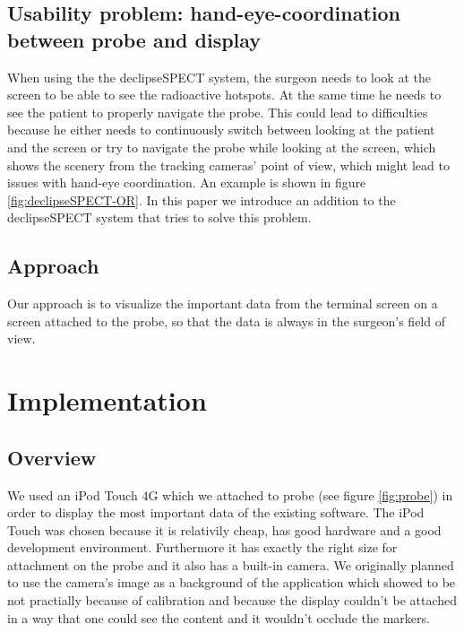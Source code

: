 \documentclass{scrartcl}
\newcommand{\red}[1]{{\color{red} #1}}
\newcommand{\refFigure}[1]{figure \ref{fig:#1}}
\begin{document}
\subsection{Usability problem: hand-eye-coordination between probe and display}
When using the the declipseSPECT system, the surgeon needs to look at the screen to be able to see the radioactive hotspots. At the same time he needs to see the patient to properly navigate the probe. This could lead to difficulties because he either needs to continuously switch between looking at the patient and the screen or try to navigate the probe while looking at the screen, which shows the scenery from the tracking cameras' point of view, which might lead to issues with hand-eye coordination. An example is shown in \refFigure{declipseSPECT-OR}.
In this paper we introduce an addition to the declipseSPECT system that tries to solve this problem.


\subsection{Approach}
Our approach is to visualize the important data from the terminal screen on a screen attached to the probe, so that the data is always in the surgeon's field of view. 



\section{Implementation}

\subsection{Overview}
We used an iPod Touch 4G which we attached to probe (see \refFigure{probe}) in order to display the most important data of the existing software.
The iPod Touch was chosen because it is relativily cheap, has good hardware and a good development environment. Furthermore it has exactly the right size for attachment on the probe and it also has a built-in camera. We originally planned to use the camera's image as a background of the application which showed to be not practially because of calibration and because the display couldn't be attached in a way that one could see the content and it wouldn't occlude the markers.
\end{document}
